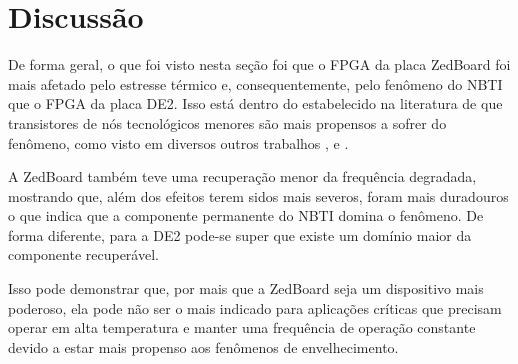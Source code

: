 \section{Discussão}
\label{ResDiscussao}

De forma geral, o que foi visto nesta seção foi que o FPGA da placa ZedBoard foi mais afetado pelo estresse térmico e, consequentemente, pelo fenômeno do NBTI que o FPGA da placa DE2. Isso está dentro do estabelecido na literatura de que transistores de nós tecnológicos menores são mais propensos a sofrer do fenômeno, como visto em diversos outros trabalhos \cite{Chen}, \cite{Paul} e \cite{Zeng}.

A ZedBoard também teve uma recuperação menor da frequência degradada, mostrando que, além dos efeitos terem sidos mais severos, foram mais duradouros o que indica que a componente permanente do NBTI \cite{Banaszeski} domina o fenômeno. De forma diferente, para a DE2 pode-se super que existe um domínio maior da componente recuperável.

Isso pode demonstrar que, por mais que a ZedBoard seja um dispositivo mais poderoso, ela pode não ser o mais indicado para aplicações críticas que precisam operar em alta temperatura e manter uma frequência de operação constante devido a estar mais propenso aos fenômenos de envelhecimento.